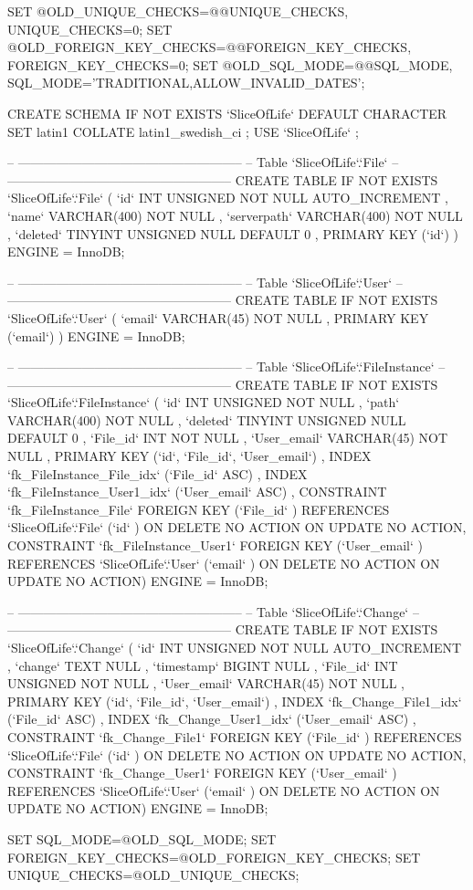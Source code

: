 \begin{spverbatim}
SET @OLD_UNIQUE_CHECKS=@@UNIQUE_CHECKS, UNIQUE_CHECKS=0;
SET @OLD_FOREIGN_KEY_CHECKS=@@FOREIGN_KEY_CHECKS, FOREIGN_KEY_CHECKS=0;
SET @OLD_SQL_MODE=@@SQL_MODE, SQL_MODE='TRADITIONAL,ALLOW_INVALID_DATES';

CREATE SCHEMA IF NOT EXISTS `SliceOfLife` DEFAULT CHARACTER SET latin1 COLLATE latin1_swedish_ci ;
USE `SliceOfLife` ;

-- -----------------------------------------------------
-- Table `SliceOfLife`.`File`
-- -----------------------------------------------------
CREATE  TABLE IF NOT EXISTS `SliceOfLife`.`File` (
  `id` INT UNSIGNED NOT NULL AUTO_INCREMENT ,
  `name` VARCHAR(400) NOT NULL ,
  `serverpath` VARCHAR(400) NOT NULL ,
  `deleted` TINYINT UNSIGNED NULL DEFAULT 0 ,
  PRIMARY KEY (`id`) )
ENGINE = InnoDB;


-- -----------------------------------------------------
-- Table `SliceOfLife`.`User`
-- -----------------------------------------------------
CREATE  TABLE IF NOT EXISTS `SliceOfLife`.`User` (
  `email` VARCHAR(45) NOT NULL ,
  PRIMARY KEY (`email`) )
ENGINE = InnoDB;


-- -----------------------------------------------------
-- Table `SliceOfLife`.`FileInstance`
-- -----------------------------------------------------
CREATE  TABLE IF NOT EXISTS `SliceOfLife`.`FileInstance` (
  `id` INT UNSIGNED NOT NULL ,
  `path` VARCHAR(400) NOT NULL ,
  `deleted` TINYINT UNSIGNED NULL DEFAULT 0 ,
  `File_id` INT NOT NULL ,
  `User_email` VARCHAR(45) NOT NULL ,
  PRIMARY KEY (`id`, `File_id`, `User_email`) ,
  INDEX `fk_FileInstance_File_idx` (`File_id` ASC) ,
  INDEX `fk_FileInstance_User1_idx` (`User_email` ASC) ,
  CONSTRAINT `fk_FileInstance_File`
    FOREIGN KEY (`File_id` )
    REFERENCES `SliceOfLife`.`File` (`id` )
    ON DELETE NO ACTION
    ON UPDATE NO ACTION,
  CONSTRAINT `fk_FileInstance_User1`
    FOREIGN KEY (`User_email` )
    REFERENCES `SliceOfLife`.`User` (`email` )
    ON DELETE NO ACTION
    ON UPDATE NO ACTION)
ENGINE = InnoDB;


-- -----------------------------------------------------
-- Table `SliceOfLife`.`Change`
-- -----------------------------------------------------
CREATE  TABLE IF NOT EXISTS `SliceOfLife`.`Change` (
  `id` INT UNSIGNED NOT NULL AUTO_INCREMENT ,
  `change` TEXT NULL ,
  `timestamp` BIGINT NULL ,
  `File_id` INT UNSIGNED NOT NULL ,
  `User_email` VARCHAR(45) NOT NULL ,
  PRIMARY KEY (`id`, `File_id`, `User_email`) ,
  INDEX `fk_Change_File1_idx` (`File_id` ASC) ,
  INDEX `fk_Change_User1_idx` (`User_email` ASC) ,
  CONSTRAINT `fk_Change_File1`
    FOREIGN KEY (`File_id` )
    REFERENCES `SliceOfLife`.`File` (`id` )
    ON DELETE NO ACTION
    ON UPDATE NO ACTION,
  CONSTRAINT `fk_Change_User1`
    FOREIGN KEY (`User_email` )
    REFERENCES `SliceOfLife`.`User` (`email` )
    ON DELETE NO ACTION
    ON UPDATE NO ACTION)
ENGINE = InnoDB;



SET SQL_MODE=@OLD_SQL_MODE;
SET FOREIGN_KEY_CHECKS=@OLD_FOREIGN_KEY_CHECKS;
SET UNIQUE_CHECKS=@OLD_UNIQUE_CHECKS;
\end{spverbatim}
\newpage
